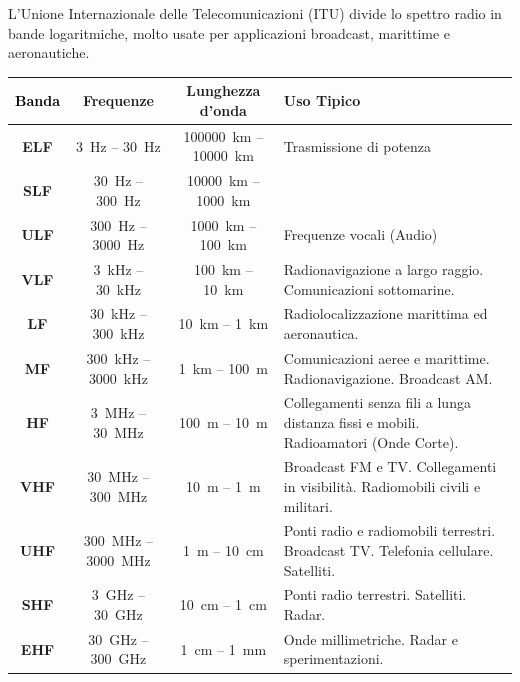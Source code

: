 \documentclass[openany,a4paper,12pt]{book}
\begin{document}
L'Unione Internazionale delle Telecomunicazioni (ITU) divide lo spettro radio in bande logaritmiche, molto usate per applicazioni broadcast, marittime e aeronautiche.

\begin{table}[H]
    \centering
    \small
    \renewcommand{\arraystretch}{1.3} %
    \begin{tabularx}{\textwidth}{>{\bfseries\color{PoliBlue}}c c c >{\raggedright\arraybackslash}X}
        \toprule
        \rowcolor{PoliBlue!10} 
        \textcolor{black}{Banda} & \textbf{Frequenze} & \textbf{Lunghezza d'onda} & \textbf{Uso Tipico} \\
        \midrule
        ELF & \qty{3}{\hertz} -- \qty{30}{\hertz} & \qty{100000}{\kilo\meter} -- \qty{10000}{\kilo\meter} & Trasmissione di potenza \\
        SLF & \qty{30}{\hertz} -- \qty{300}{\hertz} & \qty{10000}{\kilo\meter} -- \qty{1000}{\kilo\meter} & \\
        ULF & \qty{300}{\hertz} -- \qty{3000}{\hertz} & \qty{1000}{\kilo\meter} -- \qty{100}{\kilo\meter} & Frequenze vocali (Audio) \\
        VLF & \qty{3}{\kilo\hertz} -- \qty{30}{\kilo\hertz} & \qty{100}{\kilo\meter} -- \qty{10}{\kilo\meter} & Radionavigazione a largo raggio. Comunicazioni sottomarine. \\
        LF & \qty{30}{\kilo\hertz} -- \qty{300}{\kilo\hertz} & \qty{10}{\kilo\meter} -- \qty{1}{\kilo\meter} & Radiolocalizzazione marittima ed aeronautica. \\
        MF & \qty{300}{\kilo\hertz} -- \qty{3000}{\kilo\hertz} & \qty{1}{\kilo\meter} -- \qty{100}{\meter} & Comunicazioni aeree e marittime. Radionavigazione. Broadcast AM. \\
        HF & \qty{3}{\mega\hertz} -- \qty{30}{\mega\hertz} & \qty{100}{\meter} -- \qty{10}{\meter} & Collegamenti senza fili a lunga distanza fissi e mobili. Radioamatori (Onde Corte). \\
        VHF & \qty{30}{\mega\hertz} -- \qty{300}{\mega\hertz} & \qty{10}{\meter} -- \qty{1}{\meter} & Broadcast FM e TV. Collegamenti in visibilità. Radiomobili civili e militari. \\
        UHF & \qty{300}{\mega\hertz} -- \qty{3000}{\mega\hertz} & \qty{1}{\meter} -- \qty{10}{\centi\meter} & Ponti radio e radiomobili terrestri. Broadcast TV. Telefonia cellulare. Satelliti. \\
        SHF & \qty{3}{\giga\hertz} -- \qty{30}{\giga\hertz} & \qty{10}{\centi\meter} -- \qty{1}{\centi\meter} & Ponti radio terrestri. Satelliti. Radar. \\
        EHF & \qty{30}{\giga\hertz} -- \qty{300}{\giga\hertz} & \qty{1}{\centi\meter} -- \qty{1}{\milli\meter} & Onde millimetriche. Radar e sperimentazioni. \\
        \bottomrule
    \end{tabularx}
\end{table}
\end{document}
